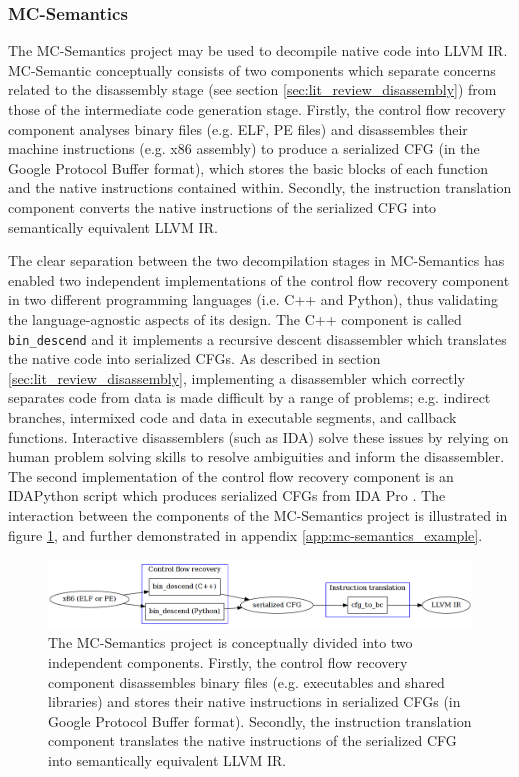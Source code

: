 
\subsubsection{MC-Semantics}
\label{sec:rel_work_mc-semantics}

The MC-Semantics project may be used to decompile native code into LLVM IR. MC-Semantic conceptually consists of two components which separate concerns related to the disassembly stage (see section \ref{sec:lit_review_disassembly}) from those of the intermediate code generation stage. Firstly, the control flow recovery component analyses binary files (e.g. ELF, PE files) and disassembles their machine instructions (e.g. x86 assembly) to produce a serialized CFG (in the Google Protocol Buffer format), which stores the basic blocks of each function and the native instructions contained within. Secondly, the instruction translation component converts the native instructions of the serialized CFG into semantically equivalent LLVM IR.

The clear separation between the two decompilation stages in MC-Semantics has enabled two independent implementations of the control flow recovery component in two different programming languages (i.e. C++ and Python), thus validating the language-agnostic aspects of its design. The C++ component is called \texttt{bin\_descend} and it implements a recursive descent disassembler which translates the native code into serialized CFGs. As described in section \ref{sec:lit_review_disassembly}, implementing a disassembler which correctly separates code from data is made difficult by a range of problems; e.g. indirect branches, intermixed code and data in executable segments, and callback functions. Interactive disassemblers (such as IDA) solve these issues by relying on human problem solving skills to resolve ambiguities and inform the disassembler. The second implementation of the control flow recovery component is an IDAPython script which produces serialized CFGs from IDA Pro \cite{mcsema}. The interaction between the components of the MC-Semantics project is illustrated in figure \ref{fig:mcsema_overview}, and further demonstrated in appendix \ref{app:mc-semantics_example}.

\begin{figure}[htbp]
	\includegraphics[width=\textwidth]{inc/3_rel_work/mcsema_overview.png}
	\caption{The MC-Semantics project is conceptually divided into two independent components. Firstly, the control flow recovery component disassembles binary files (e.g. executables and shared libraries) and stores their native instructions in serialized CFGs (in Google Protocol Buffer format). Secondly, the instruction translation component translates the native instructions of the serialized CFG into semantically equivalent LLVM IR.}
	\label{fig:mcsema_overview}
\end{figure}

